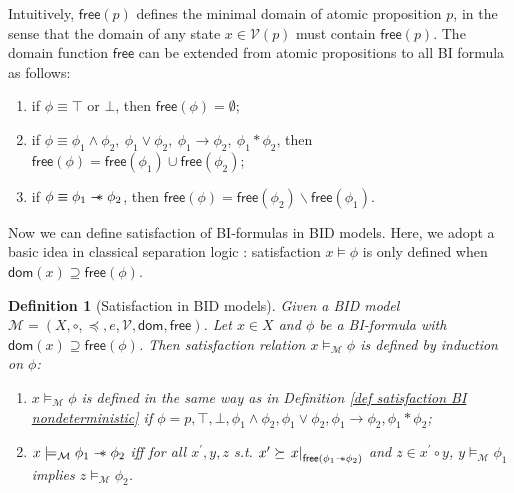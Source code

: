 \documentclass[conference,compsoc, 10pt]{IEEEtran}
\newtheorem{definition}{Definition}[section]
\newcommand {\cM } {{\mathcal{M}}}
\newcommand {\cV } {{\mathcal{V}}}
\newcommand {\LTypeEs } {{\mathsf{dom}}}
\newcommand {\LTypeE }[1] {{\mathsf{dom}\!\left(#1\right)}}
\newcommand {\LTypeFs } {{\mathsf{free}}}
\newcommand {\LTypeF }[1] {{\mathsf{free}{\left(#1\right)}}}
\newcommand {\rt }[2] {{\left.{#1}\right|_{#2}}}
\newcommand {\sepimp} {\mathrel{-\mkern-6mu*}}
\newcommand {\AP} {{\mathcal{AP}}}
\begin{document}
\begin{appendices}
		Intuitively, $\LTypeFs(p)$ defines the minimal domain of atomic proposition $p$, in the sense that the domain of any state $x\in \cV(p)$ must contain $\LTypeF{p}$. The domain function $\LTypeFs$ can be extended from atomic propositions to all BI formula as follows:
		\begin{enumerate}
			\item if $\phi\equiv \top$ or $\bot$, then $\LTypeF{\phi} = \emptyset$;
			\item if $\phi\equiv \phi_1\wedge\phi_2,\ \phi_1\vee\phi_2,\ \phi_1\rightarrow\phi_2,\ \phi_1\ast\phi_2$, then $\LTypeF{\phi} = \LTypeF{\phi_1}\cup \LTypeF{\phi_2}$;
			\item if $\phi\equiv \phi_1\sepimp\phi_2$, then $\LTypeF{\phi} = \LTypeF{\phi_2}\backslash\LTypeF{\phi_1}$.
		\end{enumerate}
		
		Now we can define satisfaction of BI-formulas in BID models. Here, we adopt a basic idea in classical separation logic \cite{Bro07,IO01,ORY01,OHe07}: satisfaction $x\models\phi$ is only defined when $\LTypeE{x}\supseteq\LTypeF{\phi}$. 
		
		\begin{definition}[Satisfaction in BID models]
			\label{def satisfaction BID}
			Given a BID model $\cM = (X,\circ,\preceq,e,\cV,\LTypeEs,\LTypeFs)$. Let $x\in X$ and $\phi$ be a BI-formula with $\LTypeE{x}\supseteq \LTypeF{\phi}$. Then satisfaction relation $x\models_\cM \phi$ is defined by induction on $\phi$:
			\begin{enumerate}
				\item $x\models_\cM \phi$ is defined in the same way as in Definition \ref{def satisfaction BI nondeterministic} if $\phi=p, \top, \bot, \phi_1\wedge\phi_2, \phi_1\vee\phi_2, \phi_1\rightarrow\phi_2, \phi_1\ast\phi_2$; 
				\item $x\models_\cM \phi_1\sepimp\phi_2$ iff for all $x^\prime,y,z$ s.t. $x^\prime\succeq \rt{x}{\LTypeF{\phi_1\sepimp\phi_2}}$ and $z\in x^\prime\circ y$, $y\models_\cM \phi_1$ implies $z\models_\cM \phi_2$.
			\end{enumerate}
		\end{definition}
		

\end{appendices}
\end{document}

